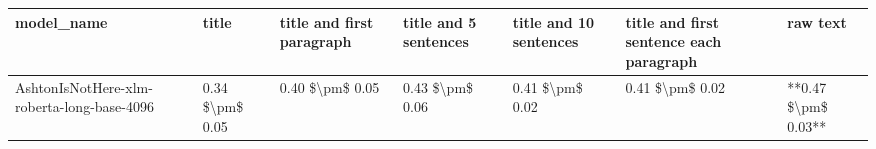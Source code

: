 \begin{tabular}{lllllll}
\toprule
                                model\_name &           title & title and first paragraph & title and 5 sentences & title and 10 sentences & title and first sentence each paragraph &            raw text \\
\midrule
AshtonIsNotHere-xlm-roberta-long-base-4096 & 0.34 \$\textbackslash pm\$ 0.05 &           0.40 \$\textbackslash pm\$ 0.05 &       0.43 \$\textbackslash pm\$ 0.06 &        0.41 \$\textbackslash pm\$ 0.02 &                         0.41 \$\textbackslash pm\$ 0.02 & **0.47 \$\textbackslash pm\$ 0.03** \\
\bottomrule
\end{tabular}
